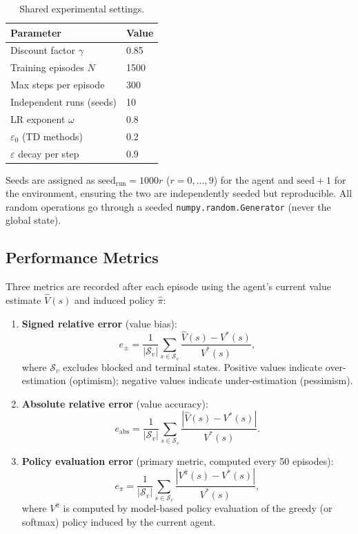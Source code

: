\documentclass[11pt]{article}
\begin{document}
\begin{table}[H]
\centering
\caption{Shared experimental settings.}
\label{tab:setup}
\begin{tabular}{ll}
\toprule
Parameter & Value \\
\midrule
Discount factor $\gamma$ & 0.85 \\
Training episodes $N$ & 1500 \\
Max steps per episode & 300 \\
Independent runs (seeds) & 10 \\
LR exponent $\omega$ & 0.8 \\
$\varepsilon_0$ (TD methods) & 0.2 \\
$\varepsilon$ decay per step & 0.9 \\
\bottomrule
\end{tabular}
\end{table}

Seeds are assigned as $\text{seed}_\text{run} = 1000r$ ($r=0,\ldots,9$) for
the agent and $\text{seed}+1$ for the environment, ensuring the two are
independently seeded but reproducible.  All random operations go through a
seeded \texttt{numpy.random.Generator} (never the global state).

\subsection{Performance Metrics}

Three metrics are recorded after each episode using the agent's current
value estimate $\hat{V}(s)$ and induced policy $\hat{\pi}$:

\begin{enumerate}[leftmargin=*]
    \item \textbf{Signed relative error} (value bias):
        \[
            e_\pm = \frac{1}{|\mathcal{S}_v|}
            \sum_{s\in\mathcal{S}_v} \frac{\hat{V}(s) - V^*(s)}{V^*(s)},
        \]
        where $\mathcal{S}_v$ excludes blocked and terminal states.
        Positive values indicate over-estimation (optimism); negative values
        indicate under-estimation (pessimism).
    \item \textbf{Absolute relative error} (value accuracy):
        \[
            e_\text{abs} = \frac{1}{|\mathcal{S}_v|}
            \sum_{s\in\mathcal{S}_v} \frac{|\hat{V}(s) - V^*(s)|}{V^*(s)}.
        \]
    \item \textbf{Policy evaluation error} (primary metric, computed every 50
        episodes):
        \[
            e_\pi = \frac{1}{|\mathcal{S}_v|}
            \sum_{s\in\mathcal{S}_v} \frac{|V^{\hat{\pi}}(s) - V^*(s)|}{V^*(s)},
        \]
        where $V^{\hat{\pi}}$ is computed by model-based policy evaluation
        of the greedy (or softmax) policy induced by the current agent.
\end{enumerate}
\end{document}
